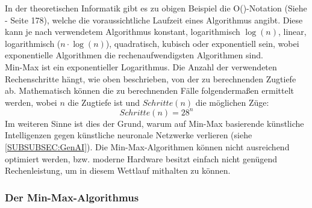 \documentclass[12pt,a4paper]{article}
\begin{document}
In der theoretischen Informatik gibt es zu obigen Beispiel die O()-Notation (Siehe \cite{pragmatic} - Seite 178), welche die voraussichtliche Laufzeit eines Algorithmus angibt. Diese kann je nach verwendetem Algorithmus konstant, logarithmisch $\log(n)$, linear, logarithmisch ($n \cdot \log(n)$), quadratisch, kubisch oder exponentiell sein, wobei exponentielle Algorithmen die rechenaufwendigsten Algorithmen sind. \\
Min-Max ist ein exponentieller Logarithmus. Die Anzahl der verwendeten Rechenschritte hängt, wie oben beschrieben, von der zu berechnenden Zugtiefe ab. Mathematisch können die zu berechnenden Fälle folgendermaßen ermittelt werden, wobei $n$ die Zugtiefe ist und $Schritte(n)$ die möglichen Züge:
\[Schritte(n) = 28^n\]
Im weiteren Sinne ist dies der Grund, warum auf Min-Max basierende künstliche Intelligenzen gegen künstliche neuronale Netzwerke verlieren (siehe \ref{SUBSUBSEC:GenAI}). Die Min-Max-Algorithmen können nicht ausreichend optimiert werden, bzw. moderne Hardware besitzt einfach nicht genügend Rechenleistung, um in diesem Wettlauf mithalten zu können. \\

\subsubsection{Der Min-Max-Algorithmus}
\label{SUBSUBSEC:MinMax}
\end{document}
